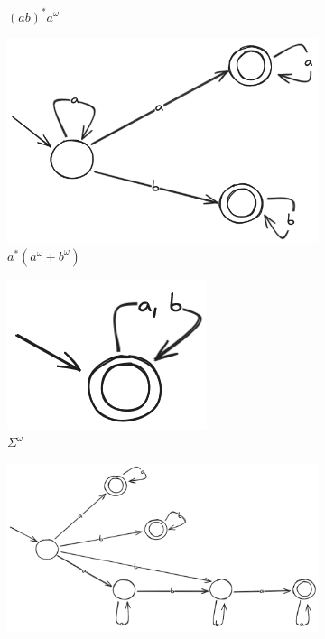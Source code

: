 \documentclass{article}
\begin{document}
\begin{figure}[!htb]
\begin{subfigure}[b]{0.2\textwidth}
		\caption{$(ab)^*a^\omega$}
	\end{subfigure}
	\hfil
	\begin{subfigure}[b]{0.2\textwidth}
		\centering
		\includegraphics[width=\textwidth]{04-10-07.png}
		\caption{$a^*(a^\omega + b^\omega)$}
	\end{subfigure}
	\hfil
	\begin{subfigure}[b]{0.1\textwidth}
		\centering
		\includegraphics[width=\textwidth]{04-10-08.png}
		\caption{$\Sigma^\omega$}
	\end{subfigure}
	\hfil
	\begin{subfigure}[b]{0.4\textwidth}
		\centering
		\includegraphics[width=\textwidth]{04-10-09.png}

\end{subfigure}
\end{figure}
\end{document}
